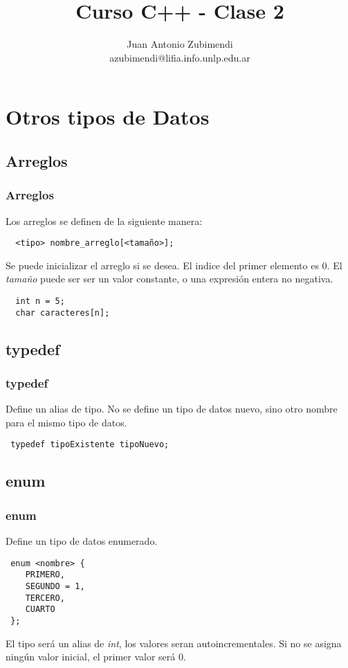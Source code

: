 \documentclass{beamer}
\title{Curso C++ - Clase 2}
\author{Juan Antonio Zubimendi\\azubimendi@lifia.info.unlp.edu.ar}
\institute{LIFIA}
\begin{document}
 
\begin{frame}
\frametitle{}
\titlepage
\end{frame}


\section{Otros tipos de Datos}

\subsection{Arreglos}
\begin{frame}[fragile]
\frametitle{Arreglos}
Los arreglos se definen de la siguiente manera:

\begin{verbatim}
  <tipo> nombre_arreglo[<tamaño>];
\end{verbatim}

Se puede inicializar el arreglo si se desea.
El indice del primer elemento es 0.
El \emph{tamaño} puede ser ser un valor constante, o una expresión entera no negativa.
\begin{verbatim}
  int n = 5;
  char caracteres[n];
\end{verbatim}

\end{frame}

\subsection{typedef}
\begin{frame}[fragile]
\frametitle{typedef}
Define un alias de tipo. No se define un tipo de datos nuevo, sino otro nombre para el mismo tipo de datos.

\begin{verbatim}
 typedef tipoExistente tipoNuevo;
\end{verbatim}

\end{frame}

\subsection{enum}
\begin{frame}[fragile]
\frametitle{enum}
Define un tipo de datos enumerado.
\begin{verbatim}
 enum <nombre> {
    PRIMERO,
    SEGUNDO = 1,
    TERCERO,
    CUARTO
 };
\end{verbatim}

El tipo será un alias de \emph{int}, los valores seran autoincrementales. Si no se asigna ningún valor inicial, el primer valor será 0.
\end{frame}
\end{document}
